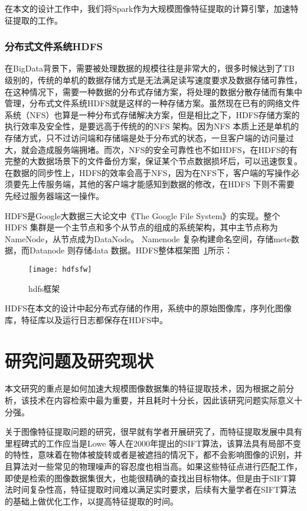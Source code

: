 在本文的设计工作中，我们将Spark作为大规模图像特征提取的计算引擎，加速特征提取的工作。
\subsubsection{分布式文件系统HDFS}
在BigData背景下，需要被处理数据的规模往往是非常大的，很多时候达到了TB级别的，传统的单机的数据存储方式是无法满足读写速度要求及数据存储可靠性，在这种情况下，需要一种数据的分布式存储方案，将处理的数据分散存储而有集中管理，分布式文件系统HDFS就是这样的一种存储方案。虽然现在已有的网络文件系统（NFS）也算是一种分布式存储解决方案，但是相比之下，HDFS存储方案的执行效率及安全性，是要远高于传统的的NFS 架构。因为NFS 本质上还是单机的存储方式，只不过访问端和存储端是处于分布式的状态，一旦客户端的访问量过大，就会造成服务端拥堵。而次，NFS的安全可靠性也不如HDFS，在HDFS的有完整的大数据场景下的文件备份方案，保证某个节点数据损坏后，可以迅速恢复。在数据的同步性上，HDFS的效率会高于NFS，因为在NFS下，客户端的写操作必须要先上传服务端，其他的客户端才能感知到数据的修改，在HDFS 下则不需要先经过服务器端这一操作。

HDFS是Google大数据三大论文中《The Google File System》的实现。整个HDFS 集群是一个主节点和多个从节点的组成的系统架构，其中主节点称为NameNode，从节点成为DataNode。 Namenode 复杂构建命名空间，存储mete数据，而Datanode 则存储data 数据。HDFS整体框架图~\ref{fig:hdfsfw}所示：
\begin{figure}[htp]
\centering
\texttt{[image: hdfsfw]}
\caption{hdfs框架}
\label{fig:hdfsfw}
\end{figure}

HDFS在本文的设计中起分布式存储的作用，系统中的原始图像库，序列化图像库，特征库以及运行日志都保存在HDFS中。

\section{研究问题及研究现状}
本文研究的重点是如何加速大规模图像数据集的特征提取技术，因为根据之前分析，该技术在内容检索中最为重要，并且耗时十分长，因此该研究问题实际意义十分强。

关于图像特征提取问题的研究，很早就有学者开展研究了，而特征提取发展中具有里程碑式的工作应当是Lowe 等人在2000年提出的SIFT算法，该算法具有局部不变的特性，意味着在物体被旋转或者是被遮挡的情况下，都不会影响图像的识别，并且算法对一些常见的物理噪声的容忍度也相当高。如果这些特征点进行匹配工作，即使是检索的图像数据集很大，也能很精确的查找出目标物体。但是由于SIFT算法时间复杂性高，特征提取时间难以满足实时要求，后续有大量学者在SIFT算法的基础上做优化工作，以提高特征提取的时间。

